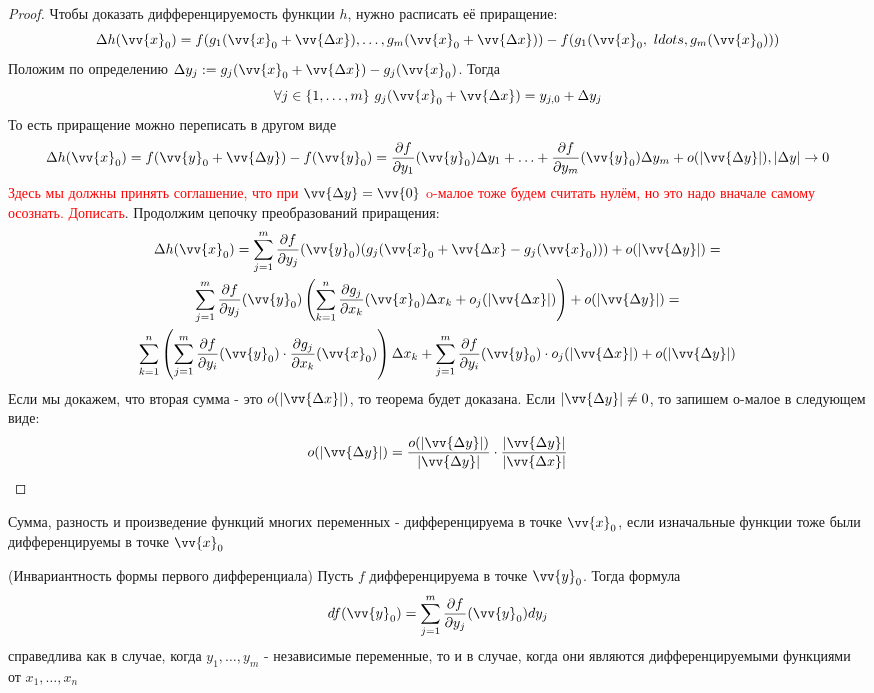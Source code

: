 \begin{proof}
	Чтобы доказать дифференцируемость функции $h$, нужно расписать её приращение:
	\[
		\Delta h(\vv{x}_0) = f(g_1(\vv{x}_0 + \vv{\Delta x}), \ldots, g_m(\vv{x}_0 + \vv{\Delta x})) - f(g_1(\vv{x}_0,\ ldots, g_m(\vv{x}_0)))
	\]
	Положим по определению $\Delta y_j := g_j(\vv{x}_0 + \vv{\Delta x}) - g_j(\vv{x}_0)$. Тогда
	\[
		\forall j \in \range{m}\ g_j(\vv{x}_0 + \vv{\Delta x}) = y_{j, 0} + \Delta y_j
	\]
	То есть приращение можно переписать в другом виде
	\[
		\Delta h(\vv{x}_0) = f(\vv{y}_0 + \vv{\Delta y}) - f(\vv{y}_0) = \frac{\vdelta f}{\vdelta y_1} (\vv{y}_0) \Delta y_1 + \ldots + \frac{\vdelta f}{\vdelta y_m} (\vv{y}_0) \Delta y_m + o(|\vv{\Delta y}|), |\Delta y| \to 0
	\]
	\textcolor{red}{Здесь мы должны принять соглашение, что при $\vv{\Delta y} = \vv{0}$ o-малое тоже будем считать нулём, но это надо вначале самому осознать. Дописать}. Продолжим цепочку преобразований приращения:
	\begin{multline*}
		\Delta h(\vv{x}_0) = \suml_{j = 1}^m \frac{\vdelta f}{\vdelta y_j} (\vv{y}_0) (g_j(\vv{x}_0 + \vv{\Delta x} - g_j(\vv{x}_0))) + o(|\vv{\Delta y}|) =
		\\
		\suml_{j = 1}^m \frac{\vdelta f}{\vdelta y_j} (\vv{y}_0) \left(\suml_{k = 1}^n \frac{\vdelta g_j}{\vdelta x_k} (\vv{x}_0) \Delta x_k + o_j(|\vv{\Delta x}|)\right) + o(|\vv{\Delta y}|) =
		\\
		\suml_{k = 1}^n \left(\suml_{j = 1}^m \frac{\vdelta f}{\vdelta y_i} (\vv{y}_0) \cdot \frac{\vdelta g_j}{\vdelta x_k} (\vv{x}_0)\right) \Delta x_k + \suml_{j = 1}^m \frac{\vdelta f}{\vdelta y_i} (\vv{y}_0) \cdot o_j(|\vv{\Delta x}|) + o(|\vv{\Delta y}|)
	\end{multline*}
	Если мы докажем, что вторая сумма - это $o(|\vv{\Delta x}|)$, то теорема будет доказана. Если $|\vv{\Delta y}| \neq 0$, то запишем о-малое в следующем виде:
	\[
		o(|\vv{\Delta y}|) = \frac{o(|\vv{\Delta y}|)}{|\vv{\Delta y}|} \cdot \frac{|\vv{\Delta y}|}{|\vv{\Delta x}|}
	\]
\end{proof}

\begin{corollary}
	Сумма, разность и произведение функций многих переменных - дифференцируема в точке $\vv{x}_0$, если изначальные функции тоже были дифференцируемы в точке $\vv{x}_0$
\end{corollary}

\begin{corollary} (Инвариантность формы первого дифференциала)
	Пусть $f$ дифференцируема в точке $\vv{y}_0$. Тогда формула
	\[
		df(\vv{y}_0) = \suml_{j = 1}^m \frac{\vdelta f}{\vdelta y_j} (\vv{y}_0) dy_j
	\]
	справедлива как в случае, когда $y_1, \ldots, y_m$ - независимые переменные, то и в случае, когда они являются дифференцируемыми функциями от $x_1, \ldots, x_n$
\end{corollary}

